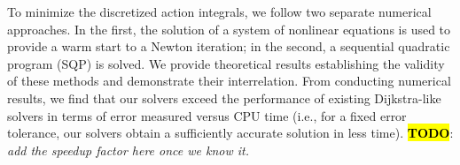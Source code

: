 \documentclass[eikonal.tex]{subfiles}
\begin{document}
To minimize the discretized action integrals, we follow two separate
numerical approaches. In the first, the solution of a system of
nonlinear equations is used to provide a warm start to a Newton
iteration; in the second, a sequential quadratic program (SQP) is
solved. We provide theoretical results establishing the validity of
these methods and demonstrate their interrelation. From conducting
numerical results, we find that our solvers exceed the performance of
existing Dijkstra-like solvers in terms of error measured versus CPU
time (i.e., for a fixed error tolerance, our solvers obtain a
sufficiently accurate solution in less time). \hl{\textbf{TODO}}:
\emph{add the speedup factor here once we know it.}
\end{document}
